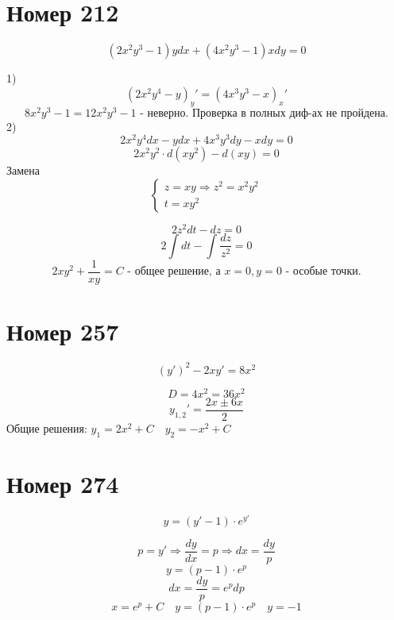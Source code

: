 \section*{Номер 212}

$$ (2x^2y^3 - 1)y dx + (4x^2y^3 - 1)x dy = 0 $$

\begin{solution}
    1) $$ (2x^2y^4 - y)_y' = (4x^3y^3 - x)_x' $$
    $$ 8x^2y^3 - 1 = 12x^2y^3 - 1 \text{ - неверно. Проверка в полных диф-ах не пройдена.} $$
    2) $$ 2x^2y^4dx - ydx + 4x^3y^3dy - xdy = 0 $$
    $$ 2x^2y^2 \cdot d(xy^2) - d(xy) = 0 $$
    Замена $$ \begin{cases}
        z = xy \Rightarrow z^2 = x^2y^2 \\
        t = xy^2
    \end{cases} $$

    $$ 2z^2 dt - dz = 0 $$
    $$ 2 \int dt - \int \dfrac{dz}{z^2} = 0 $$
    $$ 2xy^2 + \dfrac{1}{xy} = C \text{ - общее решение, а $x = 0, y = 0$ - особые точки.}$$
\end{solution}

\section*{Номер 257}
$$ (y')^2 - 2xy' = 8x^2 $$
\begin{solution}
    $$ D = 4x^2 = 36x^2 $$
    $$ y_{1,2}' = \dfrac{2x \pm 6x}{2} $$
    Общие решения: $ y_1 = 2x^2 + C \quad y_2 = -x^2 + C $
    
\end{solution}

\section*{Номер 274}

$$ y = (y' - 1) \cdot e^{y'}$$

\begin{solution}
    $$ p = y' \Rightarrow \dfrac{dy}{dx} = p \Rightarrow dx = \dfrac{dy}{p} $$
    $$ y = (p - 1) \cdot e^p $$
    $$ dx = \dfrac{dy}{p} = e^p dp $$
    $$ x = e^p + C \quad y = (p - 1) \cdot e^p \quad y = -1 $$
\end{solution}
\pagebreak
